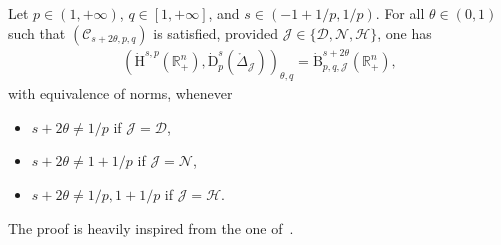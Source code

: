 \documentclass[10pt]{amsart}
\theoremstyle{definition}\newtheorem{defi}[theo]{Definition}\newtheorem{rema}[theo]{Remark}\newtheorem{exam}[theo]{Example}\newtheorem{exem}[theo]{Example}\newtheorem{nota}[theo]{Notation}
\newcommand{\bbR}{\mathbb{R}}
\newcommand{\rmH}{\mathrm{H}}%
\newcommand{\rmB}{\mathrm{B}}
\newcommand{\rmD}{\mathrm{D}}
\newcommand{\clH}{\mathcal{H}}
\newcommand{\clC}{\mathcal{C}}
\newcommand{\clN}{\mathcal{N}}
\newcommand{\clJ}{\mathcal{J}}
\newcommand{\clD}{\mathcal{D}}
\begin{document}
\begin{prop}\label{prop:InterpHomDomainLaplacians}
Let $p\in(1,+\infty)$, $q\in[1,+\infty]$, and $s\in(-1+1/p,1/p)$. For all $\theta\in(0,1)$ such that $(\clC_{s+2\theta,p,q})$ is satisfied, provided $\clJ\in\{\clD,\clN,\clH\}$, one has
\begin{align*}
\left(\dot{\rmH}^{s,p}\left(\bbR^n_+\right),\dot{\rmD}^{s}_{p}\left(\mathring{\Delta}_\clJ\right)\right)_{\theta,q} = \dot{\rmB}^{s+2\theta}_{p,q,\clJ}\left(\bbR^n_+\right),
\end{align*}
with equivalence of norms, whenever
\begin{itemize}
\item $s+2\theta\neq 1/p$ if $\clJ=\clD$,
\item $s+2\theta\neq 1+1/p$ if $\clJ=\clN$,
\item $s+2\theta\neq 1/p,1+1/p$ if $\clJ=\clH$.
\end{itemize}
\end{prop}

The proof is heavily inspired from the one of~\cite[Proposition~4.12]{DanchinHieberMuchaTolk2020}.
\end{document}
